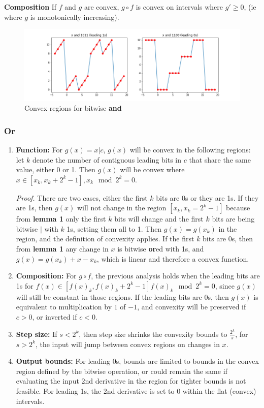 \documentclass[11pt]{article}
\theoremstyle{definition}
\begin{document}
\textbf{Composition} If $f$ and $g$ are convex, $g \circ f$ is convex on intervals where $g' \geq 0$, (ie where $g$ is monotonically increasing).

\begin{figure}[h!]
  \centering
  \includegraphics[width=\linewidth]{figs/and.png}
  \caption{Convex regions for bitwise \textbf{and}}
\end{figure}

\subsubsection*{Or}
\begin{enumerate}
\item \textbf{Function:}  For $g(x) = x | c$, $g(x)$ will be convex in the following regions: let $k$ denote the number of contiguous leading bits in $c$ that share the same value, either 0 or 1. Then $g(x)$ will be convex where $x \in [x_k, x_k + 2^k - 1], x_k \mod 2^k = 0$. 

{\it Proof.} There are two cases, either the first $k$ bits are 0s or they are 1s. If they are 1s, then $g(x)$ will not change in the region $[x_k, x_k = 2^k-1]$ because from \textbf{lemma 1} only the first $k$ bits will change and the first $k$ bits are being bitwise $|$ with $k$ 1s, setting them all to 1. Then $g(x) = g(x_k)$ in the region, and the definition of convexity applies. If the first $k$ bits are 0s, then from \textbf{lemma 1} any change in $x$ is bitwise \textbf{or}ed with 1s, and $g(x) = g(x_k) + x - x_k$, which is linear and therefore a convex function. 

\item \textbf{Composition:} For $g \circ f$, the previous analysis holds when the leading bits are 1s for $f(x) \in [f(x)_k, f(x)_k + 2^k - 1] f(x)_k \mod 2^k = 0$, since $g(x)$ will still be constant in those regions. If the leading bits are 0s, then $g(x)$ is equivalent to multiplication by $1$ of $-1$, and convexity will be preserved if $c > 0$, or inverted if $c < 0$. 
\item \textbf{Step size:} If $s < 2^k$, then step size shrinks the convexity bounds to $\frac{2^k}{s}$, for $s > 2^k$, the input will jump between convex regions on changes in $x$. 
\item \textbf{Output bounds:} For leading 0s, bounds are limited to bounds in the convex region defined by the bitwise operation, or could remain the same if evaluating the input 2nd derivative in the region for tighter bounds is not feasible. For leading 1s, the 2nd derivative is set to 0 within the flat (convex) intervals.
\end{enumerate}
\end{document}
